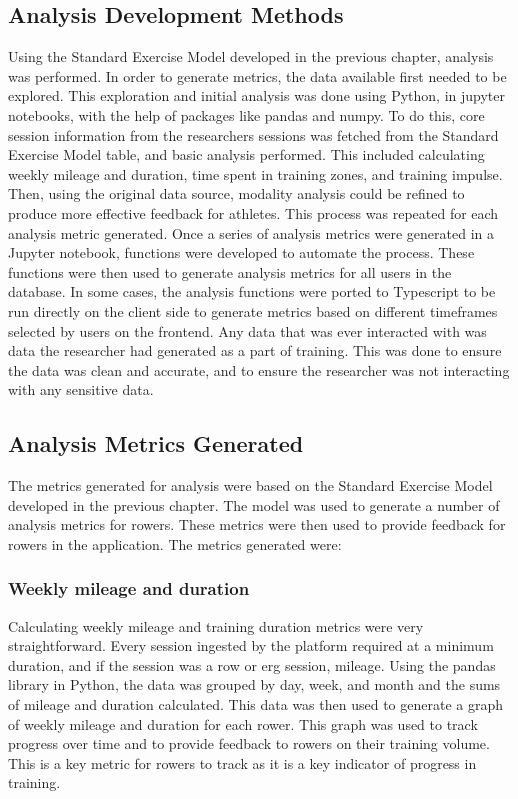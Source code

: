 \subsection{Analysis Development Methods}
Using the Standard Exercise Model developed in the previous chapter, analysis was performed. In order to generate metrics, the data available first needed to be explored. This exploration and initial analysis was done using Python, in jupyter notebooks, with the help of packages like pandas and numpy. To do this, core session information from the researchers sessions was fetched from the Standard Exercise Model table, and basic analysis performed. This included calculating weekly mileage and duration, time spent in training zones, and training impulse. Then, using the original data source, modality analysis could be refined to produce more effective feedback for athletes. This process was repeated for each analysis metric generated. Once a series of analysis metrics were generated in a Jupyter notebook, functions were developed to automate the process. These functions were then used to generate analysis metrics for all users in the database. In some cases, the analysis functions were ported to Typescript to be run directly on the client side to generate metrics based on different timeframes selected by users on the frontend. Any data that was ever interacted with was data the researcher had generated as a part of training. This was done to ensure the data was clean and accurate, and to ensure the researcher was not interacting with any sensitive data.

\subsection{Analysis Metrics Generated}
The metrics generated for analysis were based on the Standard Exercise Model developed in the previous chapter. The model was used to generate a number of analysis metrics for rowers. These metrics were then used to provide feedback for rowers in the application. The metrics generated were:
\subsubsection{Weekly mileage and duration}
Calculating weekly mileage and training duration metrics were very straightforward. Every session ingested by the platform required at a minimum duration, and if the session was a row or erg session, mileage. Using the pandas library in Python, the data was grouped by day, week, and month and the sums of mileage and duration calculated. 
This data was then used to generate a graph of weekly mileage and duration for each rower. This graph was used to track progress over time and to provide feedback to rowers on their training volume. This is a key metric for rowers to track as it is a key indicator of progress in training.
